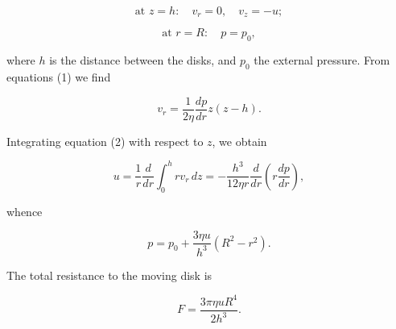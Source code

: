 \documentclass{article}
\begin{document}
$$
\text{at } z = h: \quad v_r = 0, \quad v_z = -u;
$$

$$
\text{at } r = R: \quad p = p_0,
$$

where $h$ is the distance between the disks, and $p_0$ the external pressure. From equations (1) we find

$$
v_r = \frac{1}{2\eta} \frac{dp}{dr} z(z - h).
$$

Integrating equation (2) with respect to $z$, we obtain

$$
u = \frac{1}{r} \frac{d}{dr} \int_0^h rv_r \, dz = -\frac{h^3}{12\eta r} \frac{d}{dr} \left( r \frac{dp}{dr} \right),
$$

whence

$$
p = p_0 + \frac{3\eta u}{h^3} (R^2 - r^2).
$$

The total resistance to the moving disk is

$$
F = \frac{3\pi \eta u R^4}{2h^3}.
$$
\end{document}

